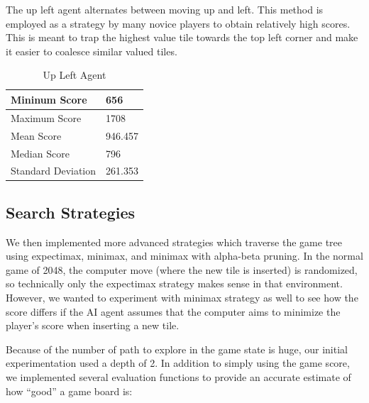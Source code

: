 \documentclass[9pt,twocolumn]{article}
\begin{document}
The up left agent alternates between moving up and left. This method is employed as a strategy by many novice players to obtain relatively high scores. This is meant to trap the highest value tile towards the top left corner and make it easier to coalesce similar valued tiles.

\begin{table}[!htbp]

\centering

\begin{tabular}{|l|l|}
\hline
Mininum Score      & 656 \\ \hline
Maximum Score      & 1708 \\ \hline
Mean Score         & 946.457 \\ \hline
Median Score       & 796 \\ \hline
Standard Deviation & 261.353 \\ \hline
\end{tabular}

\caption{Up Left Agent}

\end{table}

\subsection{Search Strategies}

We then implemented more advanced strategies which traverse the game tree using expectimax, minimax, and minimax with alpha-beta pruning. In the normal game of 2048, the computer move (where the new tile is inserted) is randomized, so technically only the expectimax strategy makes sense in that environment. However, we wanted to experiment with minimax strategy as well to see how the score differs if the AI agent assumes that the computer aims to minimize the player's score when inserting a new tile.

Because of the number of path to explore in the game state is huge, our initial experimentation used a depth of 2. In addition to simply using the game score, we implemented several evaluation functions to provide an accurate estimate of how “good” a game board is:
\end{document}
